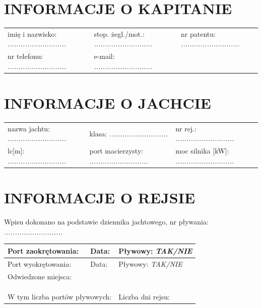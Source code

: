 \documentclass{article}
\begin{document}
\section*{INFORMACJE O KAPITANIE}
\begin{tabularx}{\textwidth}{X X X}
imię i nazwisko: \textit{...........................} & stop. żegl./mot.: \textit{...........................} & nr patentu: \textit{...........................} \\
nr telefonu: \textit{...........................} & e-mail: \textit{...........................} \\
\end{tabularx}

\section*{INFORMACJE O JACHCIE}

\begin{tabularx}{\textwidth}{X X X}
nazwa jachtu: \textit{...........................} & klasa: \textit{...........................} & nr rej.: \textit{...........................} \\
lc[m]: \textit{...........................} & port macierzysty: \textit{...........................} & moc silnika [kW]: \textit{...........................} \\
\end{tabularx}

\section*{INFORMACJE O REJSIE}

Wpisu dokonano na podstawie dziennika jachtowego, nr pływania: \textit{...........................}
\\

\begin{tabularx}{\textwidth}{|X|X|X|}
\hline
Port zaokrętowania: \textit{} & Data: \textit{} & Pływowy: \textit{TAK/NIE} \\
\hline
Port wyokrętowania: \textit{} & Data: \textit{} & Pływowy: \textit{TAK/NIE} \\
\hline
\multicolumn{3}{|l|}{Odwiedzone miejsca:
\dotfill} \\
\multicolumn{3}{|l|}{\dotfill} \\
\multicolumn{3}{|l|}{\dotfill} \\
\multicolumn{3}{|l|}{\dotfill} \\

\hline
\multicolumn{2}{|l|}{W tym liczba portów pływowych: \textit{}} & Liczba dni rejsu: \textit{}\\
\hline
\end{tabularx}
\\\\
\end{document}
